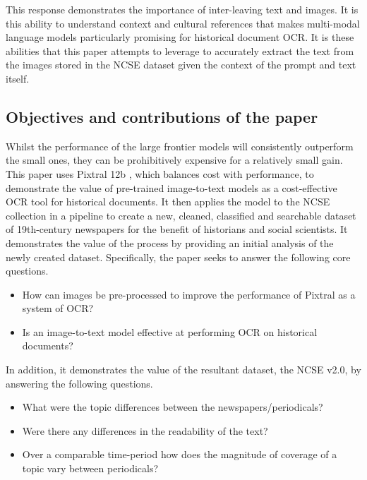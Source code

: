 \documentclass{article} %
\begin{document}
This response demonstrates the importance of inter-leaving text and images. It is this ability to understand context and cultural references that makes multi-modal language models particularly promising for historical document OCR. It is these abilities that this paper attempts to leverage to accurately extract the text from the images stored in the NCSE dataset given the context of the prompt and text itself.  


\subsection{Objectives and contributions of the paper}

Whilst the performance of the large frontier models will consistently outperform the small ones, they can be prohibitively expensive for a relatively small gain. This paper uses Pixtral 12b \cite{agrawal_pixtral_2024}, which balances cost with performance, to demonstrate the value of pre-trained image-to-text models as a cost-effective OCR tool for historical documents. It then applies the model to the NCSE \cite{brake_nineteenth-century_2008} collection in a pipeline to create a new, cleaned, classified and searchable dataset of 19th-century newspapers for the benefit of historians and social scientists. It demonstrates the value of the process by providing an initial analysis of the newly created dataset. Specifically, the paper seeks to answer the following core questions.

\begin{itemize}
    \item How can images be pre-processed to improve the performance of Pixtral as a system of OCR?
    \item Is an image-to-text model effective at performing OCR on historical documents?
\end{itemize}


In addition, it demonstrates the value of the resultant dataset, the NCSE v2.0, by answering the following questions.

\begin{itemize}
    \item What were the topic differences between the newspapers/periodicals?
    \item Were there any differences in the readability of the text?
    \item Over a comparable time-period how does the magnitude of coverage of a topic vary between periodicals?
\end{itemize}
\end{document}

